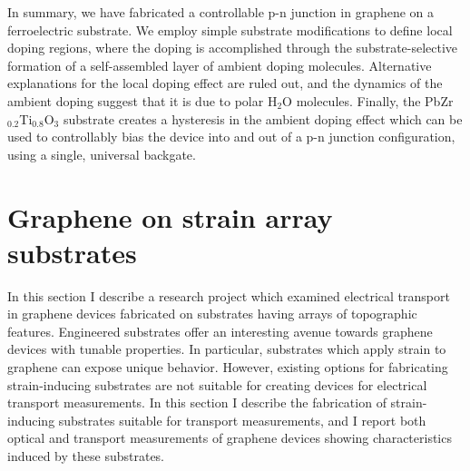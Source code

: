 \documentclass[edeposit,fullpage,draftthesis]{uiucthesis2009}
\begin{document}
        In summary, we have fabricated a controllable p-n junction in graphene on a ferroelectric substrate. We employ simple substrate modifications to define local doping regions, where the doping is accomplished through the substrate-selective formation of a self-assembled layer of ambient doping molecules. Alternative explanations for the local doping effect are ruled out, and the dynamics of the ambient doping suggest that it is due to polar H$_2$O molecules. Finally, the PbZr$_{0.2}$Ti$_{0.8}$O$_3$ substrate creates a hysteresis in the ambient doping effect which can be used to controllably bias the device into and out of a p-n junction configuration, using a single, universal backgate.




\section{Graphene on strain array substrates}
\label{sec:res:strain}

            
    In this section I describe a research project which examined electrical transport in graphene
    devices fabricated on substrates having arrays of topographic features.
    Engineered substrates offer an interesting avenue towards graphene devices with tunable properties.
    In particular, substrates which apply strain to graphene can expose unique behavior.
    However, existing options for fabricating strain-inducing substrates are not suitable for creating 
    devices for electrical transport measurements.
    In this section I describe the fabrication of strain-inducing substrates suitable for transport measurements,
    and I report both optical and transport measurements of graphene devices showing characteristics induced by these substrates.
            
\end{document}
